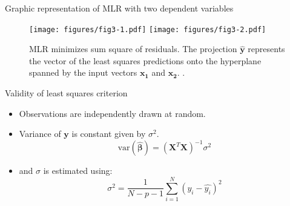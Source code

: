 \documentclass[aspectratio=169]{beamer}
\let \vec \mathbf
\begin{document}
\begin{frame}{Graphic representation of MLR with two dependent variables}
    \begin{figure}
        \centering
        \texttt{[image: figures/fig3-1.pdf]}
        \texttt{[image: figures/fig3-2.pdf]}
        \caption{MLR minimizes sum square of residuals. The projection $\vec{\hat{y}}$ represents the vector of the least squares predictions onto the hyperplane spanned by the input vectors $\vec{x_1}$ and $\vec{x_2}$. \cite{hastieElementsStatisticalLearning2016}.}
    \end{figure}
\end{frame}


\begin{frame}{Validity of least squares criterion}
    \begin{itemize}
        \item Observations are independently drawn at random.
        \item Variance of $\vec{y}$ is constant given by $\sigma^2$.
    \begin{equation*}
        \mathrm{var}(\hat{\bm{\beta}}) = (\vec{X}^T \vec{X})^{-1} \sigma^2
    \end{equation*}
    \item and $\sigma$ is estimated using:
    \begin{equation*}
        \sigma^2 = \frac{1}{N-p-1}\sum_{i=1}^N (y_i - \hat{y_i})^2
    \end{equation*}
    \end{itemize}
\end{frame}
\end{document}
